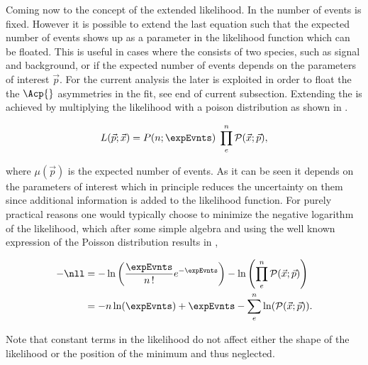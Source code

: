 Coming now to the concept of the extended likelihood. In  the number of events is fixed. However it is possible to
extend the last equation such that the expected number of events shows up as a parameter in the likelihood function which can be floated.
This is useful in cases where the \pdf consists of two species, such as signal and background, or if the expected number of events depends on the
parameters of interest $\vec{p}$. For the current analysis the later is exploited in order to float the the $\Acp{}$ asymmetries in the fit,
see end of current subsection. Extending the \pdf is achieved by multiplying the likelihood with a poison distribution as shown in .

\begin{equation}
L(\vec{p};\vec{x}) = P(n;\expEvnts) \; \prod_e^n \mathcal{P}(\vec{x};\vec{p}),
\label{extlikelihood}
\end{equation}

\noindent where $\mu(\vec{p})$ is the expected number of events. As it can be seen it depends on the parameters of interest which in
principle reduces the uncertainty on them since additional information is added to the likelihood function.
For purely practical reasons one would typically choose to minimize the negative logarithm of the likelihood, which after some simple
algebra and using the well known expression of the Poisson distribution results in ,

\begin{align}
  -\nll &= -\ln\left( \frac{\expEvnts}{n\,!} e^{-\expEvnts } \right) - \ln\left( \prod_e^n \mathcal{P}(\vec{x};\vec{p}) \right)  \nonumber \\
        &= - n\ln(\expEvnts) + \expEvnts - \sum_e^n \ln( \mathcal{P}(\vec{x};\vec{p}) ).
\label{extloglikelihood}
\end{align}

\noindent Note that constant terms in the likelihood do not affect either the shape of the likelihood or the position of the minimum and thus neglected.




